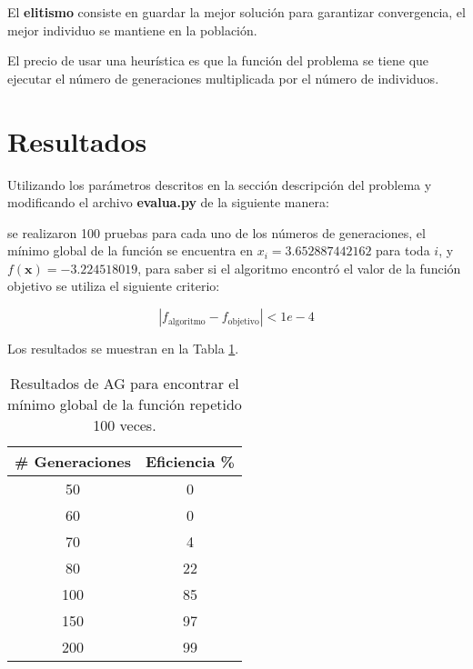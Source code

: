 \documentclass[conference]{IEEEtran}
\begin{document}
El \textbf{elitismo} consiste en guardar la mejor solución para garantizar convergencia, el mejor individuo se mantiene en la población.

El precio de usar una heurística es que la función del problema
se tiene que ejecutar el número de generaciones multiplicada por el
número de individuos.




\section{Resultados}
Utilizando los parámetros descritos en la sección  descripción del problema  y modificando el archivo \textbf{evalua.py} de la siguiente manera:


se realizaron 100 pruebas para cada uno de los números de generaciones, el mínimo global de la función se encuentra en $x_{i} = 3.652887442162$ para toda $i$, y  $f(\mathbf{x}) = -3.224518019$, para saber si el algoritmo encontró el valor de la función objetivo se utiliza el siguiente criterio:

\begin{equation}
| f_{\text{algoritmo}} - f_{\text{objetivo}}| < 1e-4
\end{equation}

Los resultados se muestran en la Tabla  \ref{tab:res}.
\begin{table}[!hbp]   
	\caption{Resultados de AG para encontrar el mínimo global de la función repetido 100 veces.}                                                                                                                
		\centering                                       
		\begin{tabular}{cc}
			\hline                                             
			\#{} Generaciones & Eficiencia \% \\                     
			\hline 
			50 & 0\\                                            
			60 & 0\\
			70 & 4\\
			80 & 22\\
			100 & 85\\
			150 & 97\\
			200 & 99\\
			\hline                                             
		\end{tabular}
		\label{tab:res}
	\end{table}	
\end{document}
